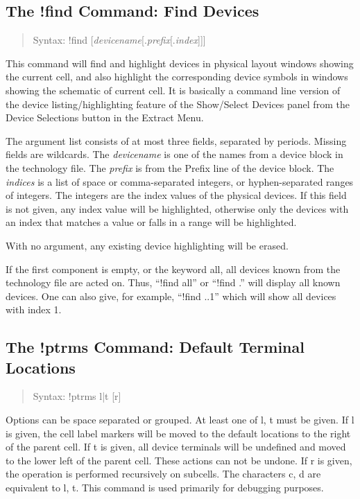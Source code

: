 \subsection{The {\cb !find} Command: Find Devices}
\begin{quote}
Syntax: {\vt !find} {[{\it devicename\/}[.{\it prefix\/}[.{\it index\/}]]]}
\end{quote}
This command will find and highlight devices in physical layout
windows showing the current cell, and also highlight the corresponding
device symbols in windows showing the schematic of current cell.  It
is basically a command line version of the device listing/highlighting
feature of the {\cb Show/Select Devices} panel from the {\cb Device
Selections} button in the {\cb Extract Menu}.
 
The argument list consists of at most three fields, separated by
periods.  Missing fields are wildcards.  The {\it devicename} is one
of the names from a device block in the technology file.  The {\it
prefix} is from the {\vt Prefix} line of the device block.  The {\it
indices} is a list of space or comma-separated integers, or
hyphen-separated ranges of integers.  The integers are the index
values of the physical devices.  If this field is not given, any index
value will be highlighted, otherwise only the devices with an index
that matches a value or falls in a range will be highlighted.

With no argument, any existing device highlighting will be erased.

If the first component is empty, or the keyword {\vt all}, all devices
known from the technology file are acted on.  Thus, ``{\vt !find
all}'' or ``{\vt !find .}'' will display all known devices.  One can
also give, for example, ``{\vt !find ..1}'' which will show all
devices with index 1.

\subsection{The {\cb !ptrms} Command: Default Terminal Locations}
\begin{quote}
Syntax: {\vt !ptrms} {\vt l}{\vt |}{\vt t} [{\vt r}]
\end{quote}
Options can be space separated or grouped.  At least one of {\vt l},
{\vt t} must be given.  If {\vt l} is given, the cell label markers
will be moved to the default locations to the right of the parent
cell.  If {\vt t} is given, all device terminals will be undefined and
moved to the lower left of the parent cell.  These actions can not be
undone.  If {\vt r} is given, the operation is performed recursively
on subcells.  The characters {\vt c}, {\vt d} are equivalent to {\vt
l}, {\vt t}.  This command is used primarily for debugging purposes.

